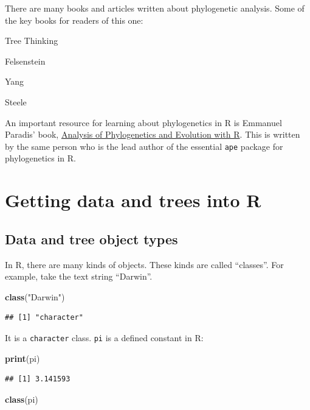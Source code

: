 \documentclass[]{book}
\newenvironment{Shaded}{\begin{snugshade}}{\end{snugshade}}
\newcommand{\KeywordTok}[1]{\textcolor[rgb]{0.13,0.29,0.53}{\textbf{{#1}}}}
\newcommand{\StringTok}[1]{\textcolor[rgb]{0.31,0.60,0.02}{{#1}}}
\newcommand{\NormalTok}[1]{{#1}}
\theoremstyle{definition}
\theoremstyle{definition}
\theoremstyle{remark}
\begin{document}
There are many books and articles written about phylogenetic analysis.
Some of the key books for readers of this one:

Tree Thinking

Felsenstein

Yang

Steele

An important resource for learning about phylogenetics in R is Emmanuel
Paradis' book,
\href{http://www.springer.com/us/book/9781461417422}{Analysis of
Phylogenetics and Evolution with R}. This is written by the same person
who is the lead author of the essential \texttt{ape} package
\citep{R-ape} for phylogenetics in R.

\chapter{Getting data and trees into
R}\label{getting-data-and-trees-into-r}

\section{Data and tree object types}\label{data-and-tree-object-types}

In R, there are many kinds of objects. These kinds are called
``classes''. For example, take the text string ``Darwin''.

\begin{Shaded}
\begin{Highlighting}[]
\KeywordTok{class}\NormalTok{(}\StringTok{"Darwin"}\NormalTok{)}
\end{Highlighting}
\end{Shaded}

\begin{verbatim}
## [1] "character"
\end{verbatim}

It is a \texttt{character} class. \texttt{pi} is a defined constant in
R:

\begin{Shaded}
\begin{Highlighting}[]
\KeywordTok{print}\NormalTok{(pi)}
\end{Highlighting}
\end{Shaded}

\begin{verbatim}
## [1] 3.141593
\end{verbatim}

\begin{Shaded}
\begin{Highlighting}[]
\KeywordTok{class}\NormalTok{(pi)}
\end{Highlighting}
\end{Shaded}
\end{document}
